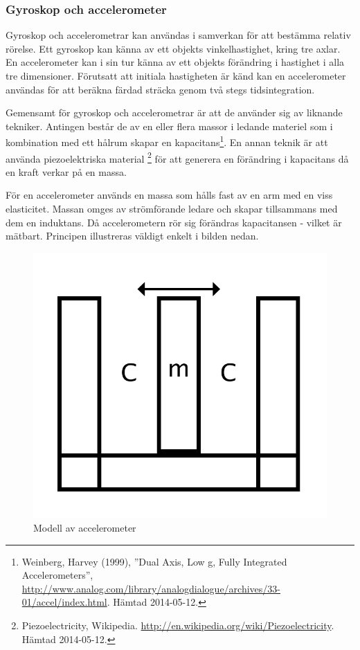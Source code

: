 \documentclass[a4paper,12pt,fleqn]{article}
\begin{document}
\subsubsection{Gyroskop och accelerometer}

Gyroskop och accelerometrar kan användas i samverkan för att bestämma relativ rörelse. Ett gyroskop kan känna av ett objekts vinkelhastighet, kring tre axlar. En accelerometer kan i sin tur känna av ett objekts förändring i hastighet i alla tre dimensioner. Förutsatt att initiala hastigheten är känd kan en accelerometer användas för att beräkna färdad sträcka genom två stegs tidsintegration. 

Gemensamt för gyroskop och accelerometrar är att de använder sig av liknande tekniker. Antingen består de av en eller flera massor i ledande materiel som i kombination med ett hålrum skapar en kapacitans\footnote{Weinberg, Harvey (1999), ''Dual Axis, Low g, Fully Integrated Accelerometers'', \url{http://www.analog.com/library/analogdialogue/archives/33-01/accel/index.html}. Hämtad 2014-05-12.}. En annan teknik är att använda piezoelektriska material \footnote{Piezoelectricity, Wikipedia. \url{http://en.wikipedia.org/wiki/Piezoelectricity}. Hämtad 2014-05-12.} för att generera en förändring i kapacitans då en kraft verkar på en massa. 

För en accelerometer används en massa som hålls fast av en arm med en viss elasticitet. Massan omges av strömförande ledare och skapar tillsammans med dem en induktans. Då accelerometern rör sig förändras kapacitansen - vilket är mätbart. Principen illustreras väldigt enkelt i bilden nedan.

\begin{figure}[htp] %
  \begin{center}
  \includegraphics[keepaspectratio=true,scale=0.5]{accelerometer.png}  %
  \end{center}
  \caption{Modell av accelerometer} %
  \label{fig:accelerometer}
\end{figure}
\end{document}
